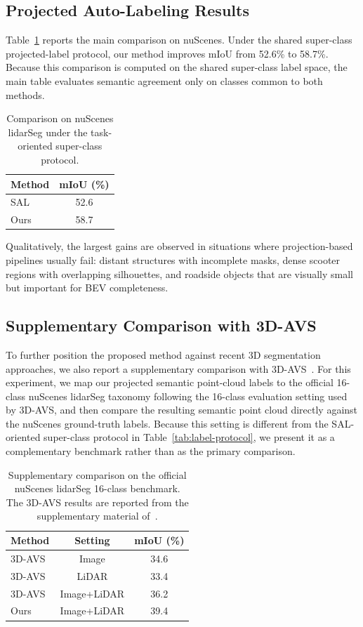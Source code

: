 \documentclass[conference]{IEEEtran}
\begin{document}
\subsection{Projected Auto-Labeling Results}
Table~\ref{tab:miou} reports the main comparison on nuScenes. Under the shared super-class projected-label protocol, our method improves mIoU from 52.6\% to 58.7\%. Because this comparison is computed on the shared super-class label space, the main table evaluates semantic agreement only on classes common to both methods.

\begin{table}[t]
  \caption{Comparison on nuScenes lidarSeg under the task-oriented super-class protocol.}
  \label{tab:miou}
  \centering
  \begin{tabular}{lc}
    \toprule
    Method & mIoU (\%) \\
    \midrule
    SAL~\cite{sal} & 52.6 \\
    Ours & 58.7 \\
    \bottomrule
  \end{tabular}
\end{table}

Qualitatively, the largest gains are observed in situations where projection-based pipelines usually fail: distant structures with incomplete masks, dense scooter regions with overlapping silhouettes, and roadside objects that are visually small but important for BEV completeness.

\subsection{Supplementary Comparison with 3D-AVS}
To further position the proposed method against recent 3D segmentation approaches, we also report a supplementary comparison with 3D-AVS~\cite{three_d_avs}. For this experiment, we map our projected semantic point-cloud labels to the official 16-class nuScenes lidarSeg taxonomy following the 16-class evaluation setting used by 3D-AVS, and then compare the resulting semantic point cloud directly against the nuScenes ground-truth labels. Because this setting is different from the SAL-oriented super-class protocol in Table~\ref{tab:label-protocol}, we present it as a complementary benchmark rather than as the primary comparison.

\begin{table}[t]
  \caption{Supplementary comparison on the official nuScenes lidarSeg 16-class benchmark. The 3D-AVS results are reported from the supplementary material of~\cite{three_d_avs_supp}.}
  \label{tab:three-d-avs}
  \centering
  \begin{tabular}{lcc}
    \toprule
    Method & Setting & mIoU (\%) \\
    \midrule
    3D-AVS~\cite{three_d_avs} & Image & 34.6 \\
    3D-AVS~\cite{three_d_avs} & LiDAR & 33.4 \\
    3D-AVS~\cite{three_d_avs} & Image+LiDAR & 36.2 \\
    Ours & Image+LiDAR & 39.4 \\
    \bottomrule
  \end{tabular}
\end{table}
\end{document}

